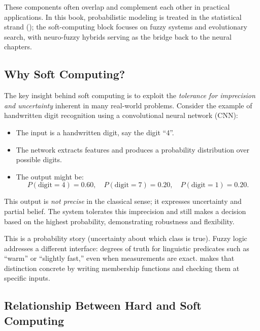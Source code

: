 These components often overlap and complement each other in practical applications. In this book, probabilistic modeling is treated in the statistical strand (); the soft-computing block focuses on fuzzy systems and evolutionary search, with neuro-fuzzy hybrids serving as the bridge back to the neural chapters.

\subsection{Why Soft Computing?}
\label{sec:softcomp_why_soft_computing}

The key insight behind soft computing is to exploit the \emph{tolerance for imprecision and uncertainty} inherent in many real-world problems. Consider the example of handwritten digit recognition using a convolutional neural network (CNN):

\begin{itemize}
    \item The input is a handwritten digit, say the digit ``4''.
    \item The network extracts features and produces a probability distribution over possible digits.
    \item The output might be:
    \begin{equation}
        P(\text{digit} = 4) = 0.60, \quad P(\text{digit} = 7) = 0.20, \quad P(\text{digit} = 1) = 0.20.
        \label{eq:softcomp_cnn_probs_example}
    \end{equation}
\end{itemize}

This output is \emph{not precise} in the classical sense; it expresses uncertainty and partial belief. The system tolerates this imprecision and still makes a decision based on the highest probability, demonstrating robustness and flexibility.

This is a probability story (uncertainty about which class is true). Fuzzy logic addresses a different interface: degrees of truth for linguistic predicates such as ``warm'' or ``slightly fast,'' even when measurements are exact.  makes that distinction concrete by writing membership functions and checking them at specific inputs.

\subsection{Relationship Between Hard and Soft Computing}
\label{sec:softcomp_relationship_between_hard_and_soft_computing}

